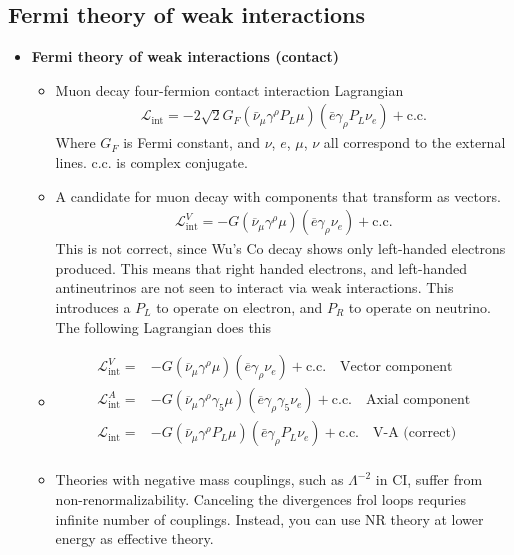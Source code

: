 \subsection{Fermi theory of weak interactions}
\begin{itemize}
    \item \textbf{Fermi theory of weak interactions (contact)} \cite{wells}
    \begin{itemize}
        \item Muon decay four-fermion contact interaction Lagrangian \cite{wells}
        \begin{equation}\begin{split}
        \mathcal{L}_\text{int}=-2\sqrt{2}G_F(\bar{\nu}_\mu\gamma^\rho P_L\mu)(\bar{e}\gamma_\rho P_L\nu_e) + \text{c.c.}
        \end{split}\end{equation}
        Where $G_F$ is Fermi constant, and $\nu$, $e$, $\mu$, $\nu$ all correspond to the external lines. c.c. is complex conjugate.
        \item A candidate for muon decay with components that transform as vectors.  \cite{wells}
        \begin{equation}\begin{split}
        \mathcal{L}^V_\text{int}=-G(\overline{\nu}_\mu\gamma^\rho\mu)(\overline{e}\gamma_\rho\nu_e)+\text{c.c.}
        \end{split}\end{equation}
        This is not correct, since Wu's Co decay shows only left-handed electrons produced. This means that right handed electrons, and left-handed antineutrinos are not seen to interact via weak interactions. This introduces a $P_L$ to operate on electron, and $P_R$ to operate on neutrino. The following Lagrangian does this
        \item  \cite{wells}
        \begin{equation}\begin{split}
        \mathcal{L}^V_\text{int}=&-G(\overline{\nu}_\mu\gamma^\rho\mu)(\overline{e}\gamma_\rho\nu_e)+\text{c.c.} \quad\text{Vector component} \\
        \mathcal{L}^A_\text{int}=&-G(\overline{\nu}_\mu\gamma^\rho\gamma_5\mu)(\overline{e}\gamma_\rho\gamma_5\nu_e)+\text{c.c.} \quad\text{Axial component} \\
        \mathcal{L}_\text{int}=&-G(\bar{\nu}_\mu\gamma^\rho P_L\mu)(\bar{e}\gamma_\rho P_L\nu_e) + \text{c.c.} \quad\text{V-A (correct)} \\
        \end{split}\end{equation}
        \item Theories with negative mass couplings, such as $\Lambda^{-2}$ in CI, suffer from non-renormalizability. Canceling the divergences frol loops requries infinite number of couplings. Instead, you can use NR theory at lower energy as effective theory. \cite{wells}
    \end{itemize}
\end{itemize}


